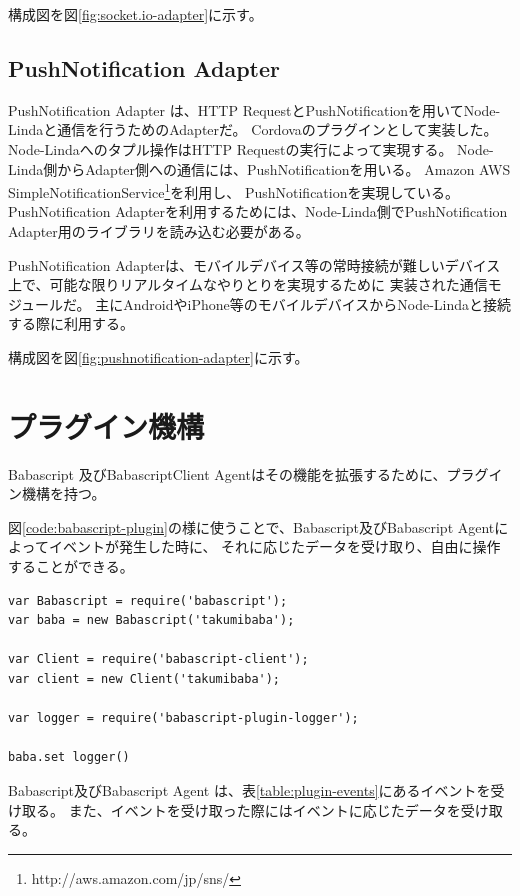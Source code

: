 構成図を図\ref{fig:socket.io-adapter}に示す。

\subsection{PushNotification Adapter}\label{pushnotification-adapter}

PushNotification Adapter は、HTTP
RequestとPushNotificationを用いてNode-Lindaと通信を行うためのAdapterだ。
Cordovaのプラグインとして実装した。 Node-Lindaへのタプル操作はHTTP
Requestの実行によって実現する。
Node-Linda側からAdapter側への通信には、PushNotificationを用いる。 Amazon
AWS
SimpleNotificationService\footnote{http://aws.amazon.com/jp/sns/}を利用し、
PushNotificationを実現している。 PushNotification
Adapterを利用するためには、Node-Linda側でPushNotification
Adapter用のライブラリを読み込む必要がある。

PushNotification
Adapterは、モバイルデバイス等の常時接続が難しいデバイス上で、可能な限りリアルタイムなやりとりを実現するために
実装された通信モジュールだ。
主にAndroidやiPhone等のモバイルデバイスからNode-Lindaと接続する際に利用する。

構成図を図\ref{fig:pushnotification-adapter}に示す。

\section{プラグイン機構}\label{ux30d7ux30e9ux30b0ux30a4ux30f3ux6a5fux69cb}

Babascript 及びBabascriptClient
Agentはその機能を拡張するために、プラグイン機構を持つ。

図\ref{code:babascript-plugin}の様に使うことで、Babascript及びBabascript
Agentによってイベントが発生した時に、
それに応じたデータを受け取り、自由に操作することができる。

\begin{lstlisting}[caption=Babascript Plugin, label=code:babascript-plugin]
var Babascript = require('babascript');
var baba = new Babascript('takumibaba');

var Client = require('babascript-client');
var client = new Client('takumibaba');

var logger = require('babascript-plugin-logger');

baba.set logger()
\end{lstlisting}

Babascript及びBabascript Agent
は、表\ref{table:plugin-events}にあるイベントを受け取る。
また、イベントを受け取った際にはイベントに応じたデータを受け取る。

